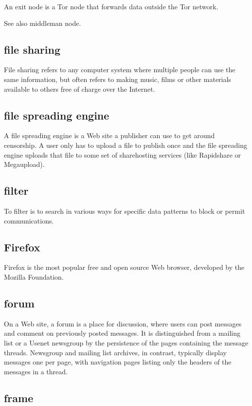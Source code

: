 An exit node is a Tor node that forwards data outside the Tor network.

See also middleman node.

\subsection{file sharing}

File sharing refers to any computer system where multiple people can use
the same information, but often refers to making music, films or other
materials available to others free of charge over the Internet.

\subsection{file spreading engine}

A file spreading engine is a Web site a publisher can use to get around
censorship. A user only has to upload a file to publish once and the
file spreading engine uploads that file to some set of sharehosting
services (like Rapidshare or Megaupload).

\subsection{filter}

To filter is to search in various ways for specific data patterns to
block or permit communications.

\subsection{Firefox}

Firefox is the most popular free and open source Web browser, developed
by the Mozilla Foundation.

\subsection{forum}

On a Web site, a forum is a place for discussion, where users can post
messages and comment on previously posted messages. It is distinguished
from a mailing list or a Usenet newsgroup by the persistence of the
pages containing the message threads. Newsgroup and mailing list
archives, in contrast, typically display messages one per page, with
navigation pages listing only the headers of the messages in a thread.

\subsection{frame}

